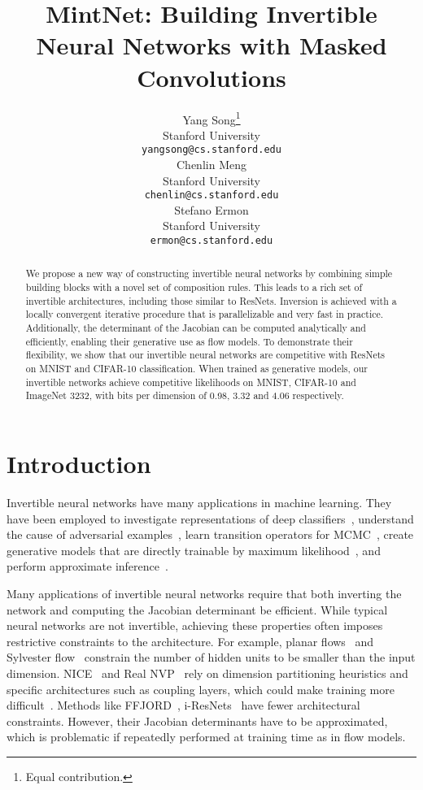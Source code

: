 \documentclass{article}
\title{MintNet: Building Invertible Neural Networks with Masked Convolutions}
\author{Yang Song\thanks{Equal contribution.} \\
  Stanford University \\
  \texttt{yangsong@cs.stanford.edu} \\
  \And
  Chenlin Meng\footnotemark[1] \\
  Stanford University \\
  \texttt{chenlin@cs.stanford.edu} \\
  \And
  Stefano Ermon \\
  Stanford University \\
  \texttt{ermon@cs.stanford.edu} \\
}
\begin{document}
\maketitle
\begin{abstract}
We propose a new way of constructing invertible neural networks by combining simple building blocks with a novel set of composition rules. This leads to a rich set of invertible architectures, including those similar to ResNets. Inversion is achieved with a locally convergent iterative procedure that is parallelizable and very fast in practice. 
Additionally, the determinant of the Jacobian can be computed analytically and efficiently, enabling their generative use as flow models. 
To demonstrate their flexibility, we show that our invertible neural networks are competitive with ResNets on MNIST and CIFAR-10 classification. 
When trained as generative models, our invertible networks achieve competitive likelihoods on MNIST, CIFAR-10 and ImageNet 3232, with bits per dimension of 0.98, 3.32 and 4.06 respectively.
\end{abstract} \section{Introduction}
Invertible neural networks
have many applications in machine learning. 
They have been employed to investigate representations of deep classifiers~\cite{jacobsen2018irevnet}, understand the cause of adversarial examples~\cite{jacobsen2018excessive}, learn transition operators for MCMC~\cite{song2017nice,levy2018generalizing}, create generative models that are directly trainable by maximum likelihood~\cite{nvp,dinh2016density,maf,glow,FFJORD,i-resnet}, and perform approximate inference~\cite{rezende15variational,kingma2016iaf}.

Many applications of invertible neural networks require that both inverting the network and computing the Jacobian determinant be efficient.
While typical neural networks are not invertible, achieving these properties often imposes restrictive constraints
to the architecture. 
For example, planar flows~\cite{rezende15variational} and Sylvester flow~\cite{berg2018sylvester} constrain the number of hidden units to be smaller than the input dimension. NICE~\cite{dinh2016density} and Real NVP~\cite{nvp} rely on dimension partitioning heuristics and specific architectures such as coupling layers, which could make training more difficult~\cite{i-resnet}. Methods like FFJORD~\cite{FFJORD}, i-ResNets~\cite{i-resnet} have fewer architectural constraints. However, their Jacobian determinants have to be approximated, which is problematic if repeatedly performed at training time as in flow models.
\end{document}
